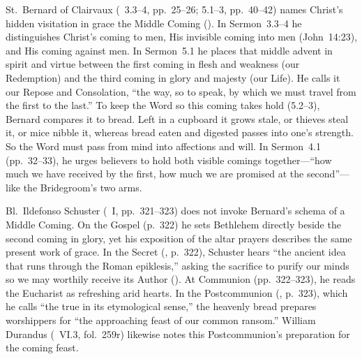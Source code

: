 St.~Bernard of Clairvaux (~3.3--4, pp.~25--26; 5.1--3, pp.~40--42) names Christ's hidden visitation in grace the Middle Coming (). In Sermon~3.3--4 he distinguishes Christ's coming to men, His invisible coming into men (John~14:23), and His coming against men. In Sermon~5.1 he places that middle advent in spirit and virtue between the first coming in flesh and weakness (our Redemption) and the third coming in glory and majesty (our Life). He calls it our Repose and Consolation, ``the way, so to speak, by which we must travel from the first to the last.'' To keep the Word so this coming takes hold (5.2--3), Bernard compares it to bread. Left in a cupboard it grows stale, or thieves steal it, or mice nibble it, whereas bread eaten and digested passes into one's strength. So the Word must pass from mind into affections and will. In Sermon~4.1 (pp.~32--33), he urges believers to hold both visible comings together---``how much we have received by the first, how much we are promised at the second''---like the Bridegroom's two arms.

Bl.~Ildefonso Schuster (~I, pp.~321--323) does not invoke Bernard's schema of a Middle Coming. On the Gospel (p.~322) he sets Bethlehem directly beside the second coming in glory, yet his exposition of the altar prayers describes the same present work of grace. In the Secret (, p.~322), Schuster hears ``the ancient idea that runs through the Roman epiklesis,'' asking the sacrifice to purify our minds so we may worthily receive its Author (). At Communion (pp.~322--323), he reads the Eucharist as refreshing arid hearts. In the Postcommunion (, p.~323), which he calls ``the true  in its etymological sense,'' the heavenly bread prepares worshippers for ``the approaching feast of our common ransom.'' William Durandus (~VI.3, fol.~259r) likewise notes this Postcommunion's preparation for the coming feast.

